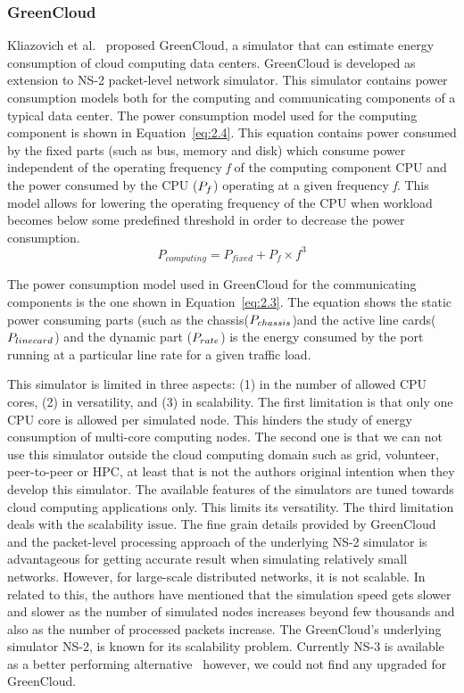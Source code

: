 \subsubsection{GreenCloud}
Kliazovich et al.~\cite{DBLP:journals/tjs/KliazovichBK12} proposed GreenCloud, a simulator that can estimate energy consumption of cloud computing data centers. GreenCloud is developed as extension to NS-2 packet-level network simulator. This simulator contains power consumption models both for the computing and communicating components of a typical data center. The power consumption model used for the computing component is shown in Equation~\ref{eq:2.4}. This equation contains power consumed by the fixed parts (such as bus, memory and disk) which consume power independent of the operating frequency \emph{f} of the computing component CPU and the power consumed by the CPU (\($$P_f$$\)) operating at a given frequency \emph{f}. This model allows for lowering the operating frequency of the CPU when workload becomes below some predefined threshold in order to decrease the power consumption. 
\begin{equation} \label{eq:2.4}
P_{computing} = P_{fixed} + P_f \times f^3
\end{equation}

The power consumption model used in GreenCloud for the communicating components is the one shown in Equation~\ref{eq:2.3}. The equation shows the static power consuming parts (such as the chassis(\($$P_{chassis}$$\))and the active line cards(\($$P_{linecard}$$\)) and the dynamic part (\($$P_{rate}$$\)) is the energy consumed by the port running at a particular line rate for a given traffic load. 

This simulator is limited in three aspects: (1) in the number of allowed CPU cores, (2) in versatility, and (3) in scalability. The first limitation is that only one CPU core is allowed per simulated node. This hinders the study of energy consumption of multi-core computing nodes. The second one is that we can not use this simulator outside the cloud computing domain such as grid, volunteer, peer-to-peer or HPC, at least that is not the authors original intention when they develop this simulator. The available features of the simulators are tuned towards cloud computing applications only. This limits its versatility. The third limitation deals with the scalability issue. The fine grain details provided by GreenCloud and the packet-level processing approach of the underlying NS-2 simulator is advantageous for getting accurate result when simulating relatively small networks. However, for large-scale distributed networks, it is not scalable. In related to this, the authors have mentioned that the simulation speed gets slower and slower as the number of simulated nodes increases beyond few thousands and also as the number of processed packets increase. The GreenCloud's underlying simulator NS-2, is known for its scalability problem. Currently NS-3 is available as a better performing alternative~\cite{DBLP:conf/icc/WeingartnerLW09} however, we could not find any upgraded for GreenCloud.





